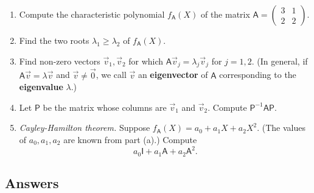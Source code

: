 \begin{enumerate}
\begin{equation*}
\end{equation*}
\begin{enumerate}
\item Compute the characteristic polynomial $f_{\mathsf{A}}(X)$ of the matrix $\mathsf{A} = \begin{pmatrix} 3 & 1 \\ 2 & 2 \end{pmatrix}$.
\item Find the two roots $\lambda_1\geq\lambda_2$ of $f_{\mathsf{A}}(X)$.
\item Find non-zero vectors $\vec{v}_1,\vec{v}_2$ for which $\mathsf{A}\vec{v}_j = \lambda_j\vec{v}_j$ for $j = 1,2$. (In general, if $\mathsf{A}\vec{v} = \lambda\vec{v}$ and $\vec{v}\neq\vec{0}$, we call $\vec{v}$ an \textbf{eigenvector} of $\mathsf{A}$ corresponding to the \textbf{eigenvalue} $\lambda$.)
\item Let $\mathsf{P}$ be the matrix whose columns are $\vec{v}_1$ and $\vec{v}_2$. Compute $\mathsf{P}^{-1}\mathsf{AP}$.
\item \emph{Cayley-Hamilton theorem.} Suppose $f_{\mathsf{A}}(X) = a_0 + a_1X + a_2X^2$. (The values of $a_0, a_1, a_2$ are known from part (a).) Compute
\begin{equation*}
a_0\mathsf{I} + a_1\mathsf{A} + a_2\mathsf{A}^2.
\end{equation*}
\end{enumerate}
\end{enumerate}


\newpage
\subsection{Answers}

